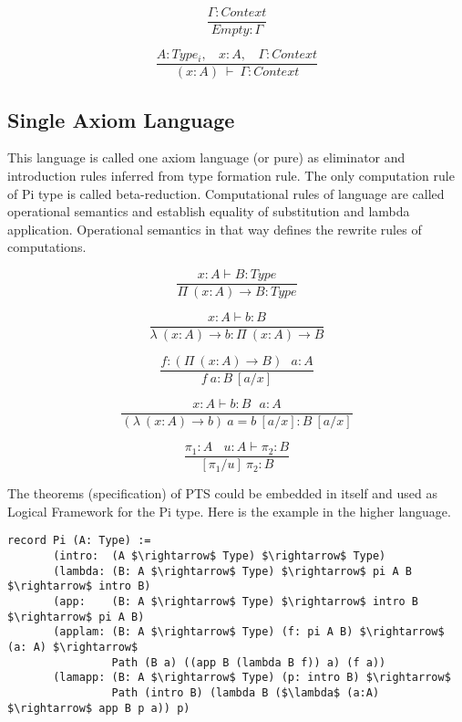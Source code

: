 \documentclass{article}
\begin{document}
\begin{equation}
\tag{Ctx-intro$_1$}
\dfrac
{\Gamma : Context}
{Empty : \Gamma}
\end{equation}

\begin{equation}
\tag{Ctx-intro$_2$}
\dfrac
{A : Type_i,\ \ \ \ x : A,\ \ \ \ \Gamma : Context}
{(x : A)\ \vdash\ \Gamma : Context}
\end{equation}

\subsection{Single Axiom Language}

This language is called one axiom language (or pure) as eliminator
and introduction rules inferred from type formation rule.
The only computation rule of Pi type is called beta-reduction.
Computational rules of language are called operational semantics
and establish equality of substitution and lambda application.
Operational semantics in that way defines the rewrite rules of computations.

\begin{equation}
\tag{$\Pi$-formation}
\dfrac
{x:A \vdash B : Type}
{\Pi\ (x:A) \rightarrow B : Type}
\end{equation}

\begin{equation}
\tag{$\lambda$-intro}
\dfrac
{x:A \vdash b : B}
{\lambda\ (x:A) \rightarrow b : \Pi\ (x: A) \rightarrow B }
\end{equation}

\begin{equation}
\tag{$App$-elimination}
\dfrac
{f: (\Pi\ (x:A) \rightarrow B)\ \ \ a: A}
{f\ a : B\ [a/x]}
\end{equation}

\begin{equation}
\tag{$\beta$-computation}
\dfrac
{x:A \vdash b: B\ \ \ a:A}
{(\lambda\ (x:A) \rightarrow b)\ a = b\ [a/x] : B\ [a/x]}
\end{equation}

\begin{equation}
\tag{subst}
\dfrac
{\pi_1 : A\ \ \ \ u:A \vdash \pi_2 : B}
{[\pi_1/u]\ \pi_2 : B}
\end{equation}

The theorems (specification) of PTS could be embedded in itself and used as
Logical Framework for the Pi type. Here is the example in the higher language.

\begin{lstlisting}[mathescape=true]
record Pi (A: Type) :=
       (intro:  (A $\rightarrow$ Type) $\rightarrow$ Type)
       (lambda: (B: A $\rightarrow$ Type) $\rightarrow$ pi A B $\rightarrow$ intro B)
       (app:    (B: A $\rightarrow$ Type) $\rightarrow$ intro B $\rightarrow$ pi A B)
       (applam: (B: A $\rightarrow$ Type) (f: pi A B) $\rightarrow$ (a: A) $\rightarrow$
                Path (B a) ((app B (lambda B f)) a) (f a))
       (lamapp: (B: A $\rightarrow$ Type) (p: intro B) $\rightarrow$
                Path (intro B) (lambda B ($\lambda$ (a:A) $\rightarrow$ app B p a)) p)
\end{lstlisting}
\end{document}
